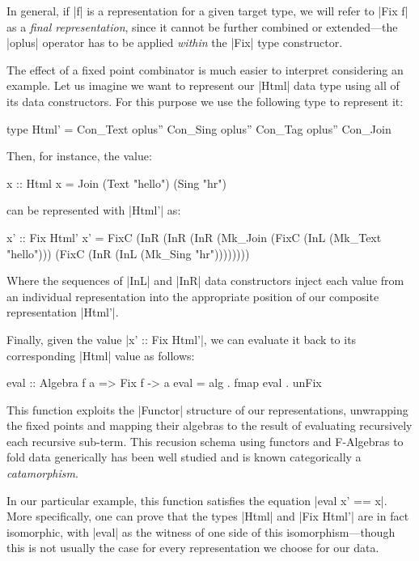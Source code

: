 In general, if |f| is a representation for a given target type, we will refer to
|Fix f| as a \emph{final representation}, since it cannot be further combined or
extended---the |oplus| operator has to be applied \emph{within} the |Fix| type
constructor.


The effect of a fixed point combinator is much easier to interpret considering
an example.
%
Let us imagine we want to represent our |Html| data type using all of its data
constructors.
%
For this purpose we use the following type to represent it:

\begin{code}
type Html' = Con_Text oplus'' Con_Sing oplus'' Con_Tag oplus'' Con_Join
\end{code}
%
Then, for instance, the value:

\begin{code}
  x :: Html
  x = Join (Text "hello") (Sing "hr")
\end{code}
%
can be represented with |Html'| as:

\begin{code}
  x' ::  Fix Html'
  x' =   FixC  (InR  (InR (InR (Mk_Join
               (FixC (InL (Mk_Text "hello")))
               (FixC (InR (InL (Mk_Sing "hr"))))))))
\end{code}
%
Where the sequences of |InL| and |InR| data constructors inject each value from
an individual representation into the appropriate position of our composite
representation |Html'|.


Finally, given the value |x' :: Fix Html'|, we can evaluate it back to its
corresponding |Html| value as follows:

\begin{code}
eval :: Algebra f a => Fix f -> a
eval = alg . fmap eval . unFix
\end{code}
%
This function exploits the |Functor| structure of our representations,
unwrapping the fixed points and mapping their algebras to the result of
evaluating recursively each recursive sub-term.
%
This recusion schema using functors and F-Algebras to fold data generically has
been well studied and is known categorically a \emph{catamorphism}.

In our particular example, this function satisfies the equation |eval x' == x|.
%
More specifically, one can prove that the types |Html| and |Fix Html'| are in
fact isomorphic, with |eval| as the witness of one side of this
isomorphism---though this is not usually the case for every representation we
choose for our data.


